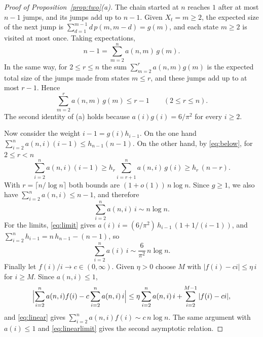 \documentclass[11pt]{amsart}
\theoremstyle{remark}
\numberwithin{equation}{section}
\begin{document}
\begin{proof}[Proof of Proposition~\ref{prop:two}(a)]
The chain started at $n$ reaches $1$ after at most $n-1$ jumps, and its jumps add up to $n-1$. Given $X_t=m\ge2$, the
expected size of the next jump is $\sum_{d=1}^{m-1}d\,p(m,m-d)=g(m)$, and each state $m\ge2$ is visited at most once.
Taking expectations,
\[
n-1=\sum_{m=2}^{n}a(n,m)\,g(m).
\]
In the same way, for $2\le r\le n$ the sum $\sum_{m=2}^{r}a(n,m)g(m)$ is the expected total size of the jumps made from
states $m\le r$, and these jumps add up to at most $r-1$. Hence
\begin{equation}\label{eq:below}
\sum_{m=2}^{r}a(n,m)\,g(m)\le r-1\qquad(2\le r\le n).
\end{equation}
The second identity of (a) holds because $a(i)g(i)=6/\pi^2$ for every $i\ge2$.

Now consider the weight $i-1=g(i)h_{i-1}$. On the one hand $\sum_{i=2}^{n}a(n,i)(i-1)\le h_{n-1}(n-1)$. On the other
hand, by \eqref{eq:below}, for $2\le r<n$
\[
\sum_{i=2}^{n}a(n,i)(i-1)\ge h_r\sum_{i=r+1}^{n}a(n,i)\,g(i)\ge h_r\,(n-r).
\]
With $r=\lceil n/\log n\rceil$ both bounds are $(1+o(1))\,n\log n$. Since $g\ge1$, we also have
$\sum_{i=2}^{n}a(n,i)\le n-1$, and therefore
\begin{equation}\label{eq:linear}
\sum_{i=2}^{n}a(n,i)\,i\sim n\log n .
\end{equation}
For the limits, \eqref{eq:limit} gives $a(i)\,i=(6/\pi^2)\,h_{i-1}\,(1+1/(i-1))$, and
$\sum_{i=2}^{n}h_{i-1}=n\,h_{n-1}-(n-1)$, so
\begin{equation}\label{eq:linearlimit}
\sum_{i=2}^{n}a(i)\,i\sim\frac{6}{\pi^2}\,n\log n .
\end{equation}
Finally let $f(i)/i\to c\in(0,\infty)$. Given $\eta>0$ choose $M$ with $|f(i)-ci|\le\eta\,i$ for $i\ge M$. Since
$a(n,i)\le1$,
\[
\Bigl|\sum_{i=2}^{n}a(n,i)f(i)-c\sum_{i=2}^{n}a(n,i)\,i\Bigr|\le\eta\sum_{i=2}^{n}a(n,i)\,i+\sum_{i=2}^{M-1}|f(i)-ci| ,
\]
and \eqref{eq:linear} gives $\sum_{i=2}^{n}a(n,i)f(i)\sim c\,n\log n$. The same argument with $a(i)\le1$ and
\eqref{eq:linearlimit} gives the second asymptotic relation.
\end{proof}
\end{document}
